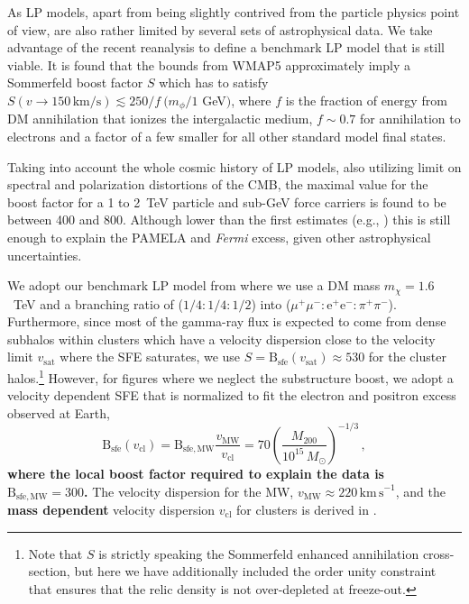 \documentclass[10pt,aps,pra,reprint,amsmath,amsfonts,amssymb,showpacs,nofootinbib,floatfix]{revtex4-1}
\def\del#1{{}}
\def\C#1{{\bf #1}}
\newcommand{\Fermi}{{\em Fermi}\xspace}
\newcommand{\rmn}{\mathrm}
\newcommand{\sfe}{\rmn{sfe}}
\newcommand{\msun}{M_\odot}
\newcommand{\B}{\rmn{B}}
\newcommand{\sigv}{v_\rmn{cl}}
\newcommand{\mvir}{M_{200}}
\newcommand{\e}{\rmn{e}}
\begin{document}
As LP models, apart from being slightly contrived from the particle
physics point of view, are also rather limited by several sets of
astrophysical data. We take advantage of the recent reanalysis
\cite{Finkbeiner:2010sm} to define a benchmark LP model that is still
viable. It is found that the bounds from WMAP5 approximately imply a
Sommerfeld boost factor $S$ which has to satisfy $S(v\to
150\,\rmn{km}/\rmn{s})\lesssim 250/f\ (m_\phi/1$ GeV$)$, where $f$ is
the fraction of energy from DM annihilation that ionizes the
intergalactic medium, $f\sim 0.7$ for annihilation to electrons and a
factor of a few smaller for all other standard model final states.

Taking into account the whole cosmic history of LP models, also
utilizing limit on spectral and polarization distortions of the CMB,
the maximal value for the boost factor for a 1 to 2~TeV particle and
sub-GeV force carriers is found to be \cite{Finkbeiner:2010sm} between
400 and 800. Although lower than the first estimates (e.g.,
\cite{Bergstrom:2009fa,Meade:2009iu}) this is still enough to explain
the PAMELA and \Fermi excess, given other astrophysical uncertainties.

We adopt our benchmark LP model from \cite{Finkbeiner:2010sm} where we
use a DM mass $m_\chi=1.6$~TeV and a branching ratio of
($1/4:1/4:1/2$) into ($\mu^+\mu^-:\e^+\e^-:\pi^+\pi^-$). Furthermore,
since most of the gamma-ray flux is expected to come from dense
subhalos within clusters which have a velocity dispersion close to the
velocity limit $v_\rmn{sat}$ where the SFE saturates, we use
$S=\B_\sfe(v_\rmn{sat})\approx 530$ for the cluster
halos.\footnote{Note that $S$ is strictly speaking the Sommerfeld
  enhanced annihilation cross-section, but here we have additionally
  included the order unity constraint that ensures that the relic
  density is not over-depleted at freeze-out.} However, for figures
where we neglect the substructure boost, we adopt a velocity dependent
SFE that is normalized to fit the electron and positron excess observed at
Earth\del{observed by the PAMELA and \Fermi satellites},
\begin{equation}
\B_\sfe(\sigv) = \B_\rmn{sfe,MW} \frac{v_\rmn{MW}}{\sigv} =
70 \left(\frac{\mvir}{10^{15}\,\msun}\right)^{-1/3}\,,
\label{eq:B_sfe}
\end{equation}
\C{where the local boost factor required to explain the data is
  $\B_\rmn{sfe,MW}=300$.} \del{Here the boost factor needed to explain
  the PAMELA/\Fermi excess of electrons and positrons
  $\B_\rmn{sfe,MW}=300$,} The velocity dispersion for the MW,
$v_\rmn{MW} \approx 220\,\rmn{km\,s}^{-1}$, and the \C{mass dependent}
velocity dispersion $\sigv$ for clusters is derived in
\cite{2005RvMP...77..207V}. \del{Note that, clusters have a larger velocity
dispersion and an accordingly smaller Sommerfeld boost factor.}
\end{document}
